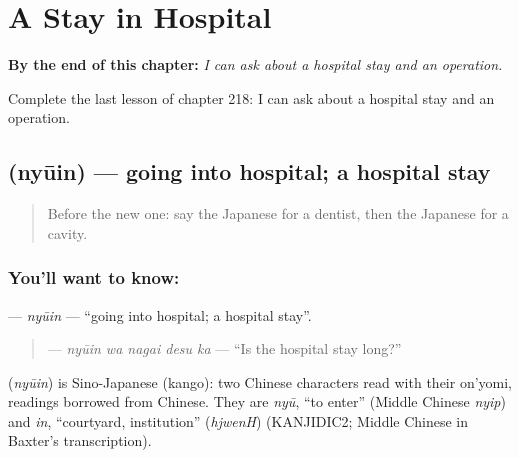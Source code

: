 
\chapter{A Stay in Hospital}
\label{ch:ja-a-stay-in-hospital}

\begin{chapteropening}
\textbf{By the end of this chapter:} \emph{I can ask about a hospital stay and an operation.}

Complete the last lesson of chapter 218: I can ask about a hospital stay and an operation.
\end{chapteropening}

\section[\texorpdfstring{\ja{にゅういん} (nyūin)}{にゅういん (nyūin)}]{ (nyūin) — going into hospital; a hospital stay}

\label{lesson:JA-C218-nyuuin}



\begin{quote}
Before the new one: say the Japanese for a dentist, then the Japanese for a cavity.
\end{quote}

\subsection*{You'll want to know: }
\textbf{} — \emph{nyūin} — \textquotedblleft{}going into hospital; a hospital stay\textquotedblright{}.

\begin{quote}
\textbf{ } — \emph{nyūin wa nagai desu ka} — \textquotedblleft{}Is the hospital stay long?\textquotedblright{}
\end{quote}

\begin{cousinweb}
\textbf{} (\emph{nyūin}) is Sino-Japanese (kango): two Chinese characters read with their on'yomi, readings borrowed from Chinese. They are \emph{nyū}, \textquotedblleft{}to enter\textquotedblright{} (Middle Chinese \emph{nyip}) and \emph{in}, \textquotedblleft{}courtyard, institution\textquotedblright{} (\emph{hjwenH}) (KANJIDIC2; Middle Chinese in Baxter's transcription).
\end{cousinweb}

